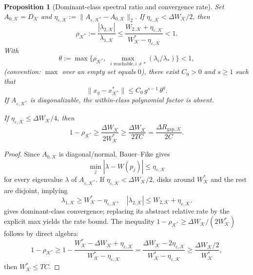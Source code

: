 \documentclass[12pt]{article}
\newtheorem{proposition}[theorem]{Proposition}
\begin{document}
\begin{proposition}[Dominant-class spectral ratio and convergence rate]\label{prop:spectral-ratio}
Set $A_{0,\mathcal{K}} = D_\mathcal{K}$ and $\eta_{\varepsilon,\mathcal{K}} := \|A_{\varepsilon,\mathcal{K}^*} - A_{0,\mathcal{K}}\|_2$. If $\eta_{\varepsilon,\mathcal{K}} < \Delta W_\mathcal{K}/2$, then
\begin{equation}
\rho_{\mathcal{K}^*} := \frac{|\lambda_{2,\mathcal{K}}|}{\lambda_{1,\mathcal{K}}}
\le \frac{W_{2,\mathcal{K}} + \eta_{\varepsilon,\mathcal{K}}}{W^*_\mathcal{K} - \eta_{\varepsilon,\mathcal{K}}} < 1.
\end{equation}
With
\begin{equation}
\theta := \max\!\bigl\{\rho_{\mathcal{K}^*},\; \max_{i \text{ reachable}, i \ne *} (\lambda_i/\lambda_*)\bigr\} < 1,
\end{equation}
(convention: $\max$ over an empty set equals $0$), there exist $C_0 > 0$ and $s \ge 1$ such that
\[
\|x_g - x^*_{\mathcal{K}^*}\| \le C_0\, g^{s-1}\, \theta^g.
\]
If $A_{\varepsilon,\mathcal{K}^*}$ is diagonalizable, the within-class polynomial factor is absent.

If $\eta_{\varepsilon,\mathcal{K}} \le \Delta W_\mathcal{K}/4$, then
\begin{equation}
1 - \rho_{\mathcal{K}^*} \ge \frac{\Delta W_\mathcal{K}}{2 W^*_\mathcal{K}} \ge \frac{\Delta W_\mathcal{K}}{2TC} = \frac{\Delta R_{\mathrm{gap},\mathcal{K}}}{2C}.
\end{equation}
\end{proposition}

\begin{proof}
Since $A_{0,\mathcal{K}}$ is diagonal/normal, Bauer--Fike gives
\[
\min_j |\lambda - W(p_j)| \le \eta_{\varepsilon,\mathcal{K}}
\]
for every eigenvalue $\lambda$ of $A_{\varepsilon,\mathcal{K}^*}$. If $\eta_{\varepsilon,\mathcal{K}} < \Delta W_\mathcal{K}/2$, disks around $W^*_\mathcal{K}$ and the rest are disjoint, implying
\[
\lambda_{1,\mathcal{K}} \ge W^*_\mathcal{K} - \eta_{\varepsilon,\mathcal{K}}, \quad |\lambda_{2,\mathcal{K}}| \le W_{2,\mathcal{K}} + \eta_{\varepsilon,\mathcal{K}}.
\]
 gives dominant-class convergence; replacing its abstract relative rate by the explicit max yields the rate bound. The inequality $1 - \rho_{\mathcal{K}^*} \ge \Delta W_\mathcal{K}/(2W^*_\mathcal{K})$ follows by direct algebra:
\[
1 - \rho_{\mathcal{K}^*}
\ge 1 - \frac{W^*_\mathcal{K} - \Delta W_\mathcal{K} + \eta_{\varepsilon,\mathcal{K}}}{W^*_\mathcal{K} - \eta_{\varepsilon,\mathcal{K}}}
= \frac{\Delta W_\mathcal{K} - 2\eta_{\varepsilon,\mathcal{K}}}{W^*_\mathcal{K} - \eta_{\varepsilon,\mathcal{K}}}
\ge \frac{\Delta W_\mathcal{K}/2}{W^*_\mathcal{K}},
\]
then $W^*_\mathcal{K} \le TC$.
\end{proof}
\end{document}
